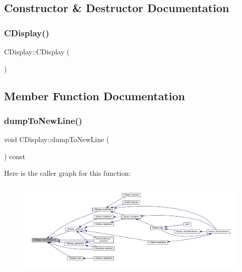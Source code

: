 \subsection{Constructor \& Destructor Documentation}
\mbox{\label{class_c_display_aeab4454cf16b08e1b091c495be595269}} 
\subsubsection{\texorpdfstring{C\+Display()}{CDisplay()}}
{\footnotesize\ttfamily C\+Display\+::\+C\+Display (\begin{DoxyParamCaption}{ }\end{DoxyParamCaption})\hspace{0.3cm}{\ttfamily [inline]}}



\subsection{Member Function Documentation}
\mbox{\label{class_c_display_aba2a285f19e987f9ba82447f43be2b10}} 
\subsubsection{\texorpdfstring{dump\+To\+New\+Line()}{dumpToNewLine()}}
{\footnotesize\ttfamily void C\+Display\+::dump\+To\+New\+Line (\begin{DoxyParamCaption}{ }\end{DoxyParamCaption}) const}

Here is the caller graph for this function\+:\nopagebreak
\begin{figure}[H]
\begin{center}
\leavevmode
\includegraphics[width=350pt]{class_c_display_aba2a285f19e987f9ba82447f43be2b10_icgraph}
\end{center}
\end{figure}
\mbox{\label{class_c_display_af552459e3405bb18e1dd879f7fdc9606}} 
